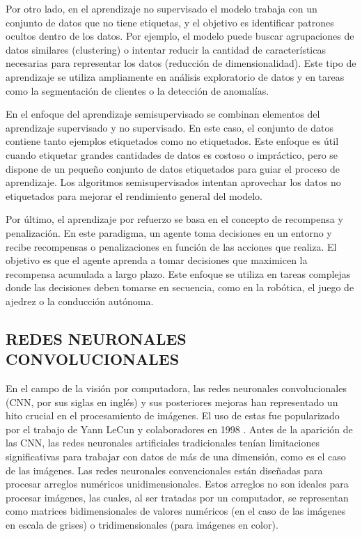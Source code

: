 Por otro lado, en el aprendizaje no supervisado el modelo trabaja con un conjunto de datos que no tiene etiquetas, y el objetivo es identificar patrones ocultos dentro de los datos. Por ejemplo, el modelo puede buscar agrupaciones de datos similares (clustering) o intentar reducir la cantidad de características necesarias para representar los datos (reducción de dimensionalidad). Este tipo de aprendizaje se utiliza ampliamente en análisis exploratorio de datos y en tareas como la segmentación de clientes o la detección de anomalías.

En el enfoque del aprendizaje semisupervisado se combinan elementos del aprendizaje supervisado y no supervisado. En este caso, el conjunto de datos contiene tanto ejemplos etiquetados como no etiquetados. Este enfoque es útil cuando etiquetar grandes cantidades de datos es costoso o impráctico, pero se dispone de un pequeño conjunto de datos etiquetados para guiar el proceso de aprendizaje. Los algoritmos semisupervisados intentan aprovechar los datos no etiquetados para mejorar el rendimiento general del modelo.

Por último, el aprendizaje por refuerzo se basa en el concepto de recompensa y penalización. En este paradigma, un agente toma decisiones en un entorno y recibe recompensas o penalizaciones en función de las acciones que realiza. El objetivo es que el agente aprenda a tomar decisiones que maximicen la recompensa acumulada a largo plazo. Este enfoque se utiliza en tareas complejas donde las decisiones deben tomarse en secuencia, como en la robótica, el juego de ajedrez o la conducción autónoma.

\subsection{REDES NEURONALES CONVOLUCIONALES}

En el campo de la visión por computadora, las redes neuronales convolucionales (CNN, por sus siglas en inglés) y sus posteriores mejoras han representado un hito crucial en el procesamiento de imágenes. El uso de estas fue popularizado por el trabajo de Yann LeCun y colaboradores en 1998 . Antes de la aparición de las CNN, las redes neuronales artificiales tradicionales tenían limitaciones significativas para trabajar con datos de más de una dimensión, como es el caso de las imágenes. Las redes neuronales convencionales están diseñadas para procesar arreglos numéricos unidimensionales. Estos arreglos no son ideales para procesar imágenes, las cuales, al ser tratadas por un computador, se representan como matrices bidimensionales de valores numéricos (en el caso de las imágenes en escala de grises) o tridimensionales (para imágenes en color).

